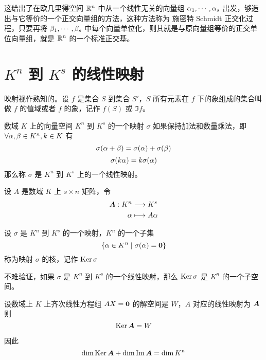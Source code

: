这给出了在欧几里得空间 $\mathbb{R}^n$ 中从一个线性无关的向量组 $\alpha_1,\cdots,\alpha_s$ 出发，够造出与它等价的一个正交向量组的方法，这种方法称为 施密特 Schmidt 正交化过程，只要再将 $\beta_1,\cdots,\beta_s$ 中每个向量单位化，则其就是与原向量组等价的正交单位向量组，就是 $\mathbb{R}^n$ 的一个标准正交基。

\section{\texorpdfstring{$K^n$ 到 $K^s$ 的线性映射}{Kn 到 Ks 的线性映射}}

映射视作熟知的。设 $f$ 是集合 $S$ 到集合 $S'$，$S$ 所有元素在 $f$ 下的象组成的集合叫做 $f$ 的值域或者 $f$ 的象，记作 $f(S)$ 或 $\Im f$。

\begin{definition}
    数域 $K$ 上的向量空间 $K^n$ 到 $K^s$ 的一个映射 $\sigma$ 如果保持加法和数量乘法，即 $\forall \alpha,\beta \in K^n,k\in K$ 有
    \[\sigma (\alpha+\beta) = \sigma(\alpha) + \sigma(\beta)\]
    \[\sigma(k\alpha) = k\sigma(\alpha)\]
    那么称 $\sigma$ 是 $K^n$ 到 $K^s$ 上的一个线性映射。
\end{definition}

设 $A$ 是数域 $K$ 上 $s\times n$ 矩阵，令
\begin{equation*}
    \begin{aligned}
        \boldsymbol{A} : K^n &\longrightarrow K^s\\
        \alpha &\longmapsto A\alpha
    \end{aligned}
\end{equation*}


\begin{definition}
    设 $\sigma$ 是 $K^n$ 到 $K^s$ 的一个映射，$K^n$ 的一个子集
    \[\{\alpha \in K^n \mid \sigma(\alpha) = \boldsymbol{0}\}\]
    称为映射 $\sigma$ 的核，记作 $\operatorname{Ker} \sigma$
\end{definition}

不难验证，如果 $\sigma$ 是 $K^n$ 到 $K^s$ 的一个线性映射，那么 $\operatorname{Ker} \sigma$ 是 $K^n$ 的一个子空间。

\begin{theorem}
    设数域上 $K$ 上齐次线性方程组 $AX = \boldsymbol{0}$ 的解空间是 $W$，$A$ 对应的线性映射为 $\boldsymbol{A}$ 则
    \[\operatorname{Ker} \boldsymbol{A} = W\]
\end{theorem}

因此
\[\dim \operatorname{Ker} \boldsymbol{A} + \dim \operatorname{Im} \boldsymbol{A} = \dim K^n\]
